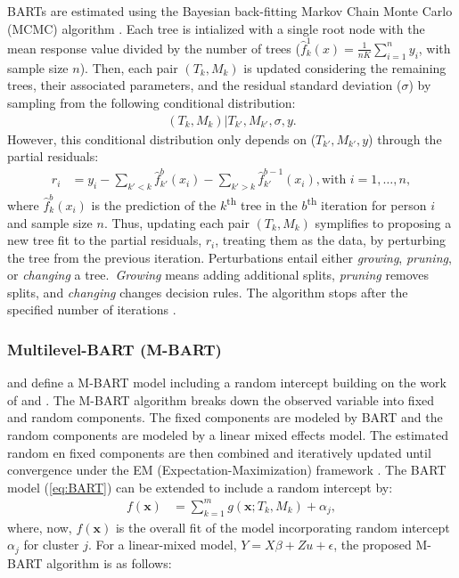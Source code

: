 \documentclass[10pt, a4paper, titlepage]{article}
\begin{document}
BARTs are estimated using the Bayesian back-fitting Markov Chain Monte Carlo (MCMC) algorithm \citep{chipman2010, hill2020, chipman2006, chipman1998,james2021}. Each tree is intialized with a single root node with the mean response value divided by the number of trees ($\hat{f}^1_k(x) = \frac{1}{nK}\sum_{i = 1}^{n}y_i$, with sample size $n$). Then, each pair $(T_k, M_k)$ is updated considering the remaining trees, their associated parameters, and the residual standard deviation ($\sigma$) by sampling from the following conditional distribution: 
\begin{align}
\label{eq:backfitting}
    (T_k, M_k)|T_{k'}, M_{k'}, \sigma, y.
\end{align} However, this conditional distribution only depends on ($T_{k'}, M_{k'}, y$) through the partial residuals:
\begin{align}
    \label{eq:partialresiduals}
    r_i &= y_i - \sum_{k' < k} \hat{f}^{b}_{k'}(x_{i}) - \sum_{k' > k} \hat{f}^{b-1}_{k'}(x_{i}), \text{with } i = 1, \dots, n,
    \end{align} where $\hat{f}^{b}_{k}(x_{i})$ is the prediction of the $k$\textsuperscript{th} tree in the $b$\textsuperscript{th} iteration for person $i$ and sample size $n$. Thus, updating each pair $(T_k, M_k)$ symplifies to proposing a new tree fit to the partial residuals, $r_{i}$, treating them as the data, by perturbing the tree from the previous iteration. Perturbations entail either \textit{growing}, \textit{pruning}, or \textit{changing} a tree.~\textit{Growing} means adding additional splits, \textit{pruning} removes splits, and \textit{changing} changes decision rules. The algorithm stops after the specified number of iterations \citep{chipman2010, hill2020, chipman2006, chipman1998, james2021}.

\subsubsection{Multilevel-BART (M-BART)}
\citet{chen2020, wagner2020} and \citet{tan2016} define a M-BART model including a random intercept building on the work of \citet{sela2012} and \citet{lin2019}. The M-BART algorithm breaks down the observed variable into fixed and random components. The fixed components are modeled by BART and the random components are modeled by a linear mixed effects model. The estimated random en fixed components are then combined and iteratively updated until convergence under the EM (Expectation-Maximization) framework \citep{chen2020, wagner2020, tan2016}. The BART model (\ref{eq:BART}) can be extended to include a random intercept by:
\begin{align} 
\label{eq:M-BART}
f(\textbf{x}) &= \sum^{m}_{k=1}g(\textbf{x}; T_{k}, M_{k}) + \alpha_{j}, 
\end{align} where, now, $f(\textbf{x})$ is the overall fit of the model incorporating random intercept $\alpha_{j}$ for cluster $j$. For a linear-mixed model, $Y = X\beta + Zu + \epsilon$, the proposed M-BART algorithm is as follows: 
\end{document}
